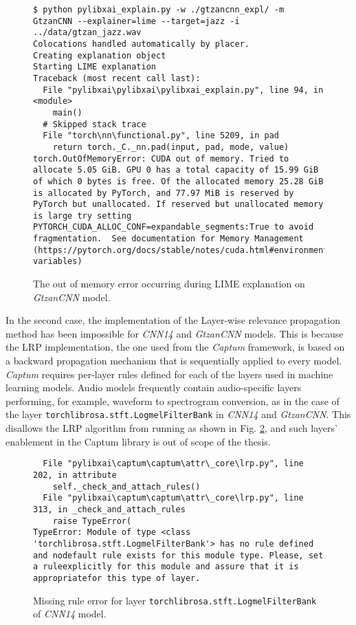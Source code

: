 \documentclass[
    bindingoffset=5mm,  %
    footnoteindent=3mm, %
    hyphenation=true    %
]{src/wut-thesis}
\begin{document}
\begin{figure}%
\begin{verbatim}
$ python pylibxai_explain.py -w ./gtzancnn_expl/ -m GtzanCNN --explainer=lime --target=jazz -i ../data/gtzan_jazz.wav
Colocations handled automatically by placer.
Creating explanation object
Starting LIME explanation
Traceback (most recent call last):
  File "pylibxai\pylibxai\pylibxai_explain.py", line 94, in <module>
    main()
  # Skipped stack trace
  File "torch\nn\functional.py", line 5209, in pad
    return torch._C._nn.pad(input, pad, mode, value)
torch.OutOfMemoryError: CUDA out of memory. Tried to allocate 5.05 GiB. GPU 0 has a total capacity of 15.99 GiB of which 0 bytes is free. Of the allocated memory 25.28 GiB is allocated by PyTorch, and 77.97 MiB is reserved by PyTorch but unallocated. If reserved but unallocated memory is large try setting PYTORCH_CUDA_ALLOC_CONF=expandable_segments:True to avoid fragmentation.  See documentation for Memory Management  (https://pytorch.org/docs/stable/notes/cuda.html#environment-variables)
\end{verbatim}
\caption{The out of memory error occurring during LIME explanation on \emph{GtzanCNN} model.}
\label{fig:LimeGtzanCNN}
\end{figure}

In the second case, the implementation of the Layer-wise relevance propagation method has been impossible for
\emph{CNN14} and \emph{GtzanCNN} models. This is because the LRP implementation, the one used from the
\emph{Captum} framework, is based on a backward propagation mechanism that is sequentially applied to every
model. \emph{Captum} requires per-layer rules defined for each of the layers used in machine learning models.
Audio models frequently contain audio-specific layers performing, for example, waveform to spectrogram conversion,
as in the case of the layer \texttt{torchlibrosa.stft.LogmelFilterBank} in \emph{CNN14} and \emph{GtzanCNN}. 
This disallows the LRP algorithm from running as shown in Fig. \ref{fig:LrpMissingLayer},
and such layers’ enablement in the Captum library is out of scope of the thesis.

\begin{figure}%
\begin{verbatim}
  File "pylibxai\captum\captum\attr\_core\lrp.py", line 202, in attribute
    self._check_and_attach_rules()
  File "pylibxai\captum\captum\attr\_core\lrp.py", line 313, in _check_and_attach_rules
    raise TypeError(
TypeError: Module of type <class 'torchlibrosa.stft.LogmelFilterBank'> has no rule defined and nodefault rule exists for this module type. Please, set a ruleexplicitly for this module and assure that it is appropriatefor this type of layer.
\end{verbatim}
\caption{Missing rule error for layer \texttt{torchlibrosa.stft.LogmelFilterBank} of \emph{CNN14} model.}
\label{fig:LrpMissingLayer}
\end{figure}
\end{document}
